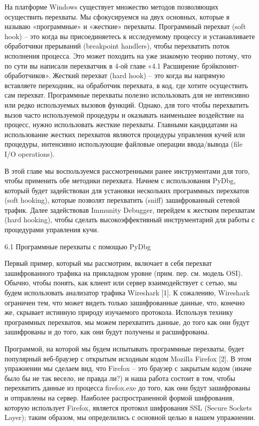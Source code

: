 \documentclass[12pt]{book}
\begin{document}
На платформе Windows существует множество методов позволяющих осуществить перехваты. Мы сфокусируемся на двух основных, которые я называю «программные» и «жесткие» перехваты. Программный перехват (soft hook) – это когда вы присоединяетесь к исследуемому процессу и устанавливаете обработчики прерываний (breakpoint handlers), чтобы перехватить поток исполнения процесса. Это может походить на уже знакомую теорию потому, что по сути вы написали перехватчик в 4-ой главе «4.1 Расширение брэйкпоинт-обработчиков». Жесткий перехват (hard hook) – это когда вы напрямую вставляете переходник, на обработчик перехвата, в код, где хотите осуществить сам перехват. Программные перехваты полезно использовать для не интенсивно или редко используемых вызовов функций. Однако, для того чтобы перехватить вызов часто используемой процедуры и оказывать наименьшее воздействие на процесс, нужно использовать жесткие перехваты. Главными кандидатами на использование жестких перехватов являются процедуры управления кучей или процедуры, интенсивно использующие файловые операции ввода/вывода (file I/O operations).

В этой главе мы воспользуемся рассмотренными ранее инструментами для того, чтобы применить обе методики перехвата. Начнем с использования PyDbg, который будет задействован для установки нескольких программных перехватов (soft hooking), которые позволят перехватить (sniff) зашифрованный сетевой трафик. Далее задействовав Immunity Debugger, перейдем к жестким перехватам (hard hooking), чтобы сделать высокоэффективный инструментарий для работы с процедурами управления кучи. 


6.1 Программные перехваты с помощью PyDbg

Первый пример, который мы рассмотрим, включает в себя перехват зашифрованного трафика на прикладном уровне (прим. пер. см. модель OSI). Обычно, чтобы понять, как клиент или сервер взаимодействует с сетью, мы будем использовать анализатор трафика Wireshark [1]. К сожалению, Wireshark ограничен тем, что может видеть только зашифрованные данные, что, конечно же, скрывает истинную природу изучаемого протокола. Используя технику программных перехватов, мы можем перехватить данные, до того как они будут зашифрованы и до того, как они будут получены и расшифрованы. 

Программой, на которой мы будем испытывать программные перехваты, будет популярный веб-браузер с открытым исходным кодом Mozilla Firefox [2]. В этом упражнении мы сделаем вид, что Firefox – это браузер с закрытым кодом (иначе было бы не так весело, не правда ли?) и наша работа состоит в том, чтобы перехватить данные из процесса firefox.exe до того, как они будут зашифрованы и отправлены на сервер. Наиболее распространенной формой шифрования, которую использует Firefox, является протокол шифрования SSL (Secure Sockets Layer); таким образом, мы определились с основной целью в нашем упражнении. 
\end{document}
